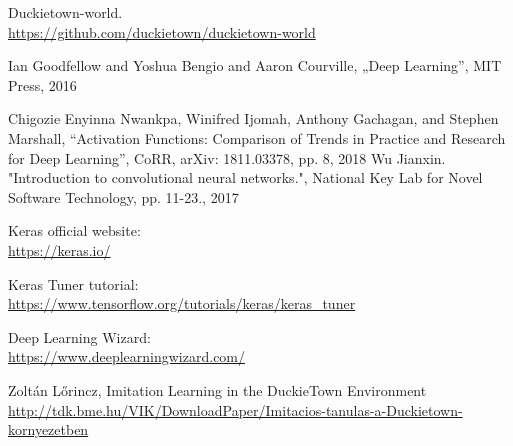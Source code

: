 \documentclass{article}
\begin{document}
Duckietown-world.
\\
\url{https://github.com/duckietown/duckietown-world}

\vspace*{1\baselineskip}

Ian Goodfellow and Yoshua Bengio and Aaron Courville, „Deep Learning”, MIT Press, 2016

\vspace*{1\baselineskip}
Chigozie Enyinna Nwankpa, Winifred Ijomah, Anthony Gachagan, and Stephen Marshall, “Activation Functions: Comparison of Trends in Practice and Research for Deep Learning”, CoRR, arXiv: 1811.03378, pp. 8, 2018
\vspace*{1\baselineskip}
Wu Jianxin. "Introduction to convolutional neural networks.", National Key Lab for Novel Software Technology, pp. 11-23., 2017
\vspace*{1\baselineskip}
\vspace*{1\baselineskip}

Keras official website:
\\
\url{https://keras.io/}
\vspace*{1\baselineskip}

Keras Tuner tutorial:
\\
\url{https://www.tensorflow.org/tutorials/keras/keras_tuner}
\vspace*{1\baselineskip}

Deep Learning Wizard:
\\
\url{https://www.deeplearningwizard.com/}
\vspace*{1\baselineskip}

Zoltán Lőrincz, Imitation Learning in the DuckieTown Environment
\\
\url{http://tdk.bme.hu/VIK/DownloadPaper/Imitacios-tanulas-a-Duckietown-kornyezetben}


\pagebreak

\clearpage
\end{document}
